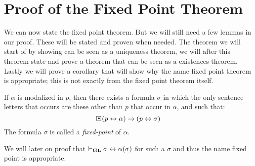 \documentclass[../main.tex]{subfiles}
\begin{document}
\section{Proof of the Fixed Point Theorem}

We can now state the fixed point theorem. But we will still need a few lemmas
in our proof. These will be stated and proven when needed. The theorem we will
start of by showing can be seen as a uniqueness theorem, we will after this
theorem state and prove a theorem that can be seen as a existences theorem.
Lastly we will prove a corollary that will show why the name fixed point
theorem is appropriate; this is not exactly from the fixed point theorem
itself.

\begin{thm}
	\label{thm:Fixed}
	If $\alpha$ is modalized in $p$, then there exists a formula $\sigma$
	in which the only sentence letters that occurs are these other than $p$
	that occur in $\alpha$, and such that:
	\[\sBox(p\leftrightarrow\alpha)\rightarrow(p\leftrightarrow\sigma)\]
	The formula $\sigma$ is called a \textit{fixed-point} of $\alpha$.
\end{thm}
We will later on proof that $\vdash_{\text{\textbf{GL}}}\sigma\leftrightarrow\alpha(\sigma)$ for
such a $\sigma$ and thus the name fixed point is appropriate.
\end{document}
